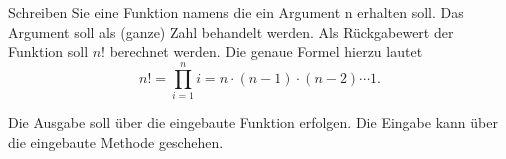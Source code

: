 %
\par Schreiben Sie eine Funktion namens  die ein Argument n erhalten soll. Das Argument soll als (ganze) Zahl behandelt werden. Als Rückgabewert der Funktion soll $n!$ berechnet werden. Die genaue Formel hierzu lautet
%
\begin{equation}
n! = \prod_{i = 1}^n i = n \cdot (n - 1) \cdot (n - 2) \cdots 1.
\end{equation}
%
\par Die Ausgabe soll über die eingebaute Funktion  erfolgen. Die Eingabe kann über die eingebaute Methode  geschehen.